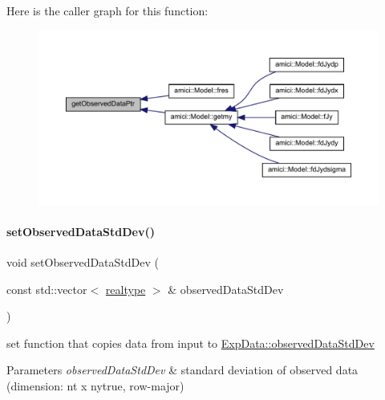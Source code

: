 Here is the caller graph for this function\+:
\nopagebreak
\begin{figure}[H]
\begin{center}
\leavevmode
\includegraphics[width=350pt]{classamici_1_1_exp_data_a8839910b831f8c55976d880df081fb3e_icgraph}
\end{center}
\end{figure}
\mbox{\label{classamici_1_1_exp_data_a5d84a162eb705e032820acd004603f29}} 
\paragraph{\texorpdfstring{set\+Observed\+Data\+Std\+Dev()}{setObservedDataStdDev()}\hspace{0.1cm}{\footnotesize\ttfamily [1/4]}}
{\footnotesize\ttfamily void set\+Observed\+Data\+Std\+Dev (\begin{DoxyParamCaption}\item[{const std\+::vector$<$ \mbox{\hyperlink{namespaceamici_a1bdce28051d6a53868f7ccbf5f2c14a3}{realtype}} $>$ \&}]{observed\+Data\+Std\+Dev }\end{DoxyParamCaption})}

set function that copies data from input to \mbox{\hyperlink{classamici_1_1_exp_data_aa097568cebb4be48c4c1dfaab0c2a159}{Exp\+Data\+::observed\+Data\+Std\+Dev}}


\begin{DoxyParams}{Parameters}
{\em observed\+Data\+Std\+Dev} & standard deviation of observed data (dimension\+: nt x nytrue, row-\/major) \\
\hline
\end{DoxyParams}


